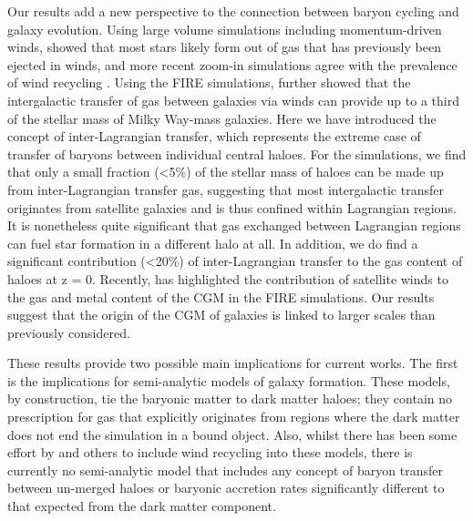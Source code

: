 Our results add a new perspective to the connection between baryon cycling
and galaxy evolution. Using large volume simulations including
momentum-driven winds, \citet{Oppenheimer2010} showed that most stars likely
form out of gas that has previously been ejected in winds, and more recent
zoom-in simulations agree with the prevalence of wind recycling
\citep{Christensen2016, AnglesAlcazar2017, Tollet2019}. Using the FIRE
simulations, \citet{AnglesAlcazar2017} further showed that the intergalactic
transfer of gas between galaxies via winds can provide up to a third of the
stellar mass of Milky Way-mass galaxies. Here we have introduced the concept
of inter-Lagrangian transfer, which represents the extreme case of transfer
of baryons between individual central haloes. For the \simba{} simulations,
we find that only a small fraction (<5\%) of the stellar mass of haloes can
be made up from inter-Lagrangian transfer gas, suggesting that most
intergalactic transfer originates from satellite galaxies and is thus
confined within Lagrangian regions. It is nonetheless quite significant that
gas exchanged between Lagrangian regions can fuel star formation in a
different halo at all. In addition, we do find a significant contribution
(<20\%) of inter-Lagrangian transfer to the gas content of haloes at z = 0.
Recently, \citet{Hafen2019, Hafen2019b} has highlighted the contribution of
satellite winds to the gas and metal content of the CGM in the FIRE
simulations. Our results suggest that the origin of the CGM of galaxies is
linked to larger scales than previously considered.

These results provide two possible main implications for current works. The
first is the implications for semi-analytic models of galaxy formation. These
models, by construction, tie the baryonic matter to dark matter haloes; they
contain no prescription for gas that explicitly originates from regions where
the dark matter does not end the simulation in a bound object. Also, whilst
there has been some effort by \citet{Henriques2015, White2015} and others to
include wind recycling into these models, there is currently no semi-analytic
model that includes any concept of baryon transfer between un-merged haloes
or baryonic accretion rates significantly different to that expected from the
dark matter component.


